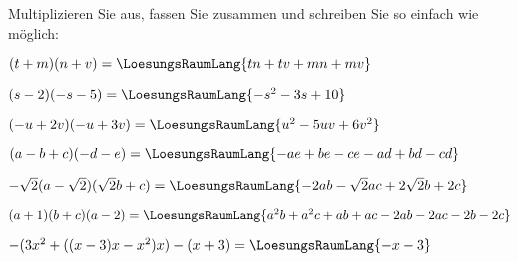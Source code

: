Multiplizieren Sie aus, fassen Sie zusammen und schreiben Sie so
einfach wie möglich:
\begin{bbwAufgabenBlock}
\item $(t+m)(n+v)=\LoesungsRaumLang{tn+tv+mn+mv}$
\item $(s-2)(-s-5) =\LoesungsRaumLang{-s^2-3s+10}$
\item $(-u+2v)(-u+3v) = \LoesungsRaumLang{u^2-5uv +6v^2}$
\item $(a-b+c)(-d-e)=\LoesungsRaumLang{-ae+be-ce-ad+bd-cd}$
\item $-\sqrt{2}(a-\sqrt{2})(\sqrt{2}b + c)
=\LoesungsRaumLang{-2ab- \sqrt{2}ac + 2\sqrt{2}b +2c}$
\item $(a+1)(b+c)(a-2) = \LoesungsRaumLang{a^2b+a^2c+ab+ac-2ab-2ac-2b-2c}$
\item $-(3x^2+((x-3)x-x^2)x)-(x+3) = \LoesungsRaumLang{-x-3}$
\end{bbwAufgabenBlock} 



